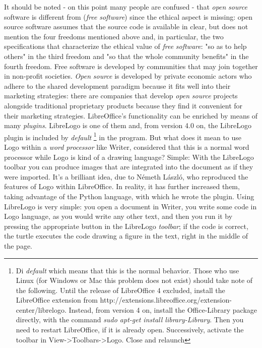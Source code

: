It should be noted - on this point many people are confused - that \textit{open} \textit{source} software is different from (\textit{free} \textit{software}) since the ethical aspect is missing: open source software assumes that the source code is available in clear, but does not mention the four freedoms mentioned above and, in particular, the two specifications that characterize the ethical value of \textit{free} \textit{software}: "so as to help others" in the third freedom and "so that the whole community benefits" in the fourth freedom. Free software is developed by communities that may join together in non-profit societies. \textit{Open} \textit{source} is developed by private economic actors who adhere to the shared development paradigm because it fits well into their marketing strategies: there are companies that develop \textit{open} \textit{source} projects alongside traditional proprietary products because they find it convenient for their marketing strategies. LibreOffice's functionality can be enriched by means of many \textit{plugins}. LibreLogo is one of them and, from version 4.0 on, the LibreLogo plugin is included by \textit{default} \footnote{Di \textit{default} which means that this is the normal behavior. Those who use Linux (for Windows or Mac this problem does not exist) should take note of the following. Until the release of LibreOffice 4 excluded, install the LibreOffice extension from http://extensions.libreoffice.org/extension-center/librelogo. Instead, from version 4 on, install the Office-Library package directly, with the command \textit{sudo apt-get install library-Library}. Then you need to restart LibreOffice, if it is already open. Successively, activate the toolbar in View->Toolbars->Logo. Close and relaunch} in the program. But what does it mean to use Logo within a \textit{word} \textit{processor} like Writer, considered that this is a normal word processor while Logo is kind of a drawing language? Simple: With the LibreLogo toolbar you can produce images that are integrated into the document as if they were imported. It's a brilliant idea, due to Németh László, who reproduced the features of Logo within LibreOffice. In reality, it has further increased them, taking advantage of the Python language, with which he wrote the plugin. Using LibreLogo is very simple: you open a document in Writer, you write some code in Logo language, as you would write any other text, and then you run it by pressing the appropriate button in the LibreLogo \textit{toolbar}; if the code is correct, the turtle executes the code drawing a figure in the text, right in the middle of the page.

